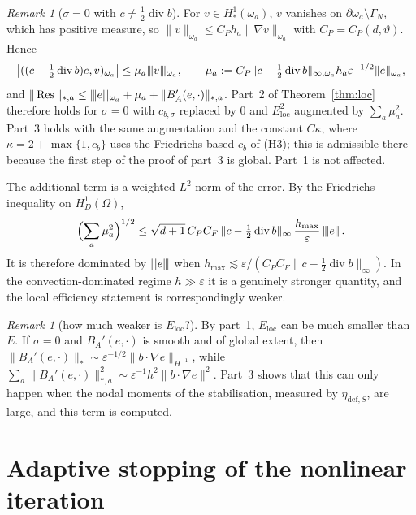 \documentclass[11pt]{article}
\newcommand{\tnorm}[1]{\lvert\kern-0.25ex\lvert\kern-0.25ex\lvert #1\rvert\kern-0.25ex\rvert\kern-0.25ex\rvert}
\newcommand{\eps}{\varepsilon}
\newcommand{\Res}{\operatorname{Res}}
\newcommand{\dv}{\operatorname{div}}
\newcommand{\defe}{\mathrm{def}}
\theoremstyle{plain}
\theoremstyle{remark}
\newtheorem{remark}[theorem]{Remark}
\numberwithin{equation}{section}
\begin{document}
\begin{remark}[$\sigma=0$ with $c\ne\tfrac12\dv b$]\label{rem:locfr}
For $v\in H^1_*(\omega_a)$, $v$ vanishes on $\partial\omega_a\setminus\Gamma_N$, which has positive
measure, so $\|v\|_{\omega_a}\le C_Ph_a\|\nabla v\|_{\omega_a}$ with $C_P=C_P(d,\vartheta)$. Hence
\[
  \bigl|((c-\tfrac12\dv b)e,v)_{\omega_a}\bigr|\le\mu_a\tnorm{v}_{\omega_a},\qquad
  \mu_a:=C_P\|c-\tfrac12\dv b\|_{\infty,\omega_a}h_a\eps^{-1/2}\|e\|_{\omega_a},
\]
and $\|\Res\|_{*,a}\le\tnorm{e}_{\omega_a}+\mu_a+\|B_A'(e,\cdot)\|_{*,a}$. Part~2 of
Theorem~\ref{thm:loc} therefore holds for $\sigma=0$ with $c_{b,\sigma}$ replaced by $0$ and
$E_{\mathrm{loc}}^2$ augmented by $\sum_a\mu_a^2$. Part~3 holds with the same augmentation and the
constant $C\kappa$, where $\kappa=2+\max\{1,c_b\}$ uses the Friedrichs-based $c_b$ of (H3); this is
admissible there because the first step of the proof of part~3 is global. Part~1 is not affected.

The additional term is a weighted $L^2$ norm of the error. By the Friedrichs inequality on
$H^1_D(\Omega)$,
\[
  \Bigl(\sum_a\mu_a^2\Bigr)^{1/2}\le\sqrt{d+1}\,C_PC_F\,\|c-\tfrac12\dv b\|_\infty\,\frac{h_{\max}}{\eps}\,\tnorm{e}.
\]
It is therefore dominated by $\tnorm{e}$ when $h_{\max}\lesssim\eps/(C_PC_F\|c-\frac12\dv b\|_\infty)$.
In the convection-dominated regime $h\gg\eps$ it is a genuinely stronger quantity, and the local
efficiency statement is correspondingly weaker.
\end{remark}

\begin{remark}[how much weaker is $E_{\mathrm{loc}}$?]
By part~1, $E_{\mathrm{loc}}$ can be much smaller than $E$. If $\sigma=0$ and $B_A'(e,\cdot)$ is
smooth and of global extent, then $\|B_A'(e,\cdot)\|_*\sim\eps^{-1/2}\|b\cdot\nabla e\|_{H^{-1}}$,
while $\sum_a\|B_A'(e,\cdot)\|_{*,a}^2\sim\eps^{-1}h^2\|b\cdot\nabla e\|^2$. Part~3 shows that this
can only happen when the nodal moments of the stabilisation, measured by $\eta_{\defe,S}$, are
large, and this term is computed.
\end{remark}

\section{Adaptive stopping of the nonlinear iteration}\label{sec:stop}
\end{document}
